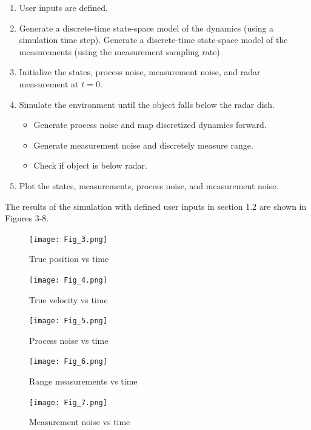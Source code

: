 \documentclass{article}
\begin{document}
\begin{enumerate}
    \item User inputs are defined.
    \item Generate a discrete-time state-space model of the dynamics (using a simulation time step). Generate a discrete-time state-space model of the measurements (using the measurement sampling rate).
    \item Initialize the states, process noise, measurement noise, and radar measurement at $t=0$.
    \item Simulate the environment until the object falls below the radar dish.
    \begin{itemize}
        \item Generate process noise and map discretized dynamics forward.
        \item Generate measurement noise and discretely measure range.
        \item Check if object is below radar.
    \end{itemize}
    \item Plot the states, measurements, process noise, and measurement noise.
\end{enumerate}

\par The results of the simulation with defined user inputs in section 1.2 are shown in Figures 3-8.

\begin{figure}[h]
    \centering
    \texttt{[image: Fig\_3.png]}
    \caption{True position vs time}
    \label{fig:enter-label}
\end{figure}

\begin{figure}[h]
    \centering
    \texttt{[image: Fig\_4.png]}
    \caption{True velocity vs time}
    \label{fig:enter-label}
\end{figure}

\begin{figure}[h]
    \centering
    \texttt{[image: Fig\_5.png]}
    \caption{Process noise vs time}
    \label{fig:enter-label}
\end{figure}

\begin{figure}[h]
    \centering
    \texttt{[image: Fig\_6.png]}
    \caption{Range measurements vs time}
    \label{fig:enter-label}
\end{figure}

\begin{figure}[h]
    \centering
    \texttt{[image: Fig\_7.png]}
    \caption{Measurement noise vs time}
    \label{fig:enter-label}
\end{figure}
\end{document}
